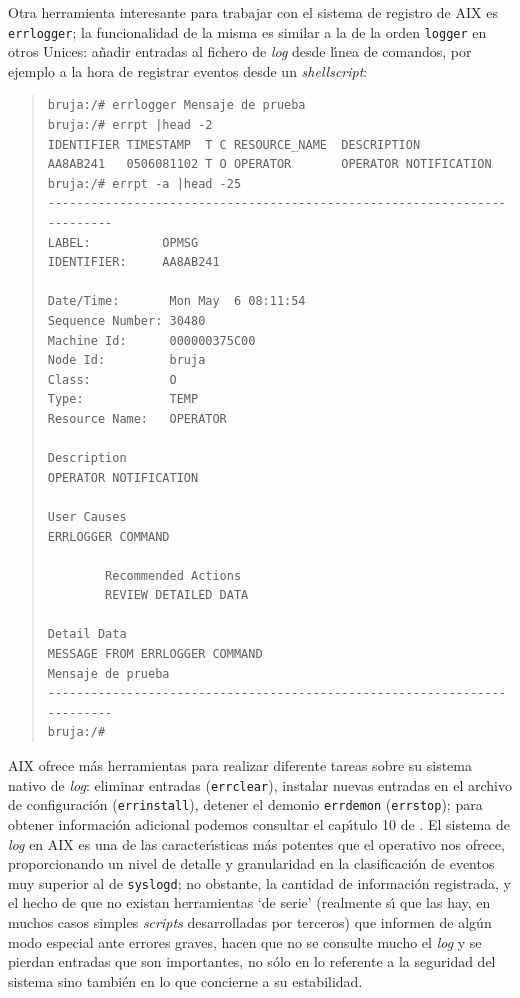 Otra herramienta interesante para trabajar con el sistema de registro de AIX
es {\tt errlogger}; la funcionalidad de la misma es similar a la de la orden
{\tt logger} en otros Unices: a\~nadir entradas al fichero de {\it log} desde
l\'{\i}nea de comandos, por ejemplo a la hora de registrar eventos desde un
{\it shellscript}:
\begin{quote}
\begin{verbatim}
bruja:/# errlogger Mensaje de prueba
bruja:/# errpt |head -2   
IDENTIFIER TIMESTAMP  T C RESOURCE_NAME  DESCRIPTION
AA8AB241   0506081102 T O OPERATOR       OPERATOR NOTIFICATION
bruja:/# errpt -a |head -25
-------------------------------------------------------------------------
LABEL:          OPMSG
IDENTIFIER:     AA8AB241

Date/Time:       Mon May  6 08:11:54 
Sequence Number: 30480
Machine Id:      000000375C00
Node Id:         bruja
Class:           O
Type:            TEMP
Resource Name:   OPERATOR

Description
OPERATOR NOTIFICATION

User Causes
ERRLOGGER COMMAND

        Recommended Actions
        REVIEW DETAILED DATA

Detail Data
MESSAGE FROM ERRLOGGER COMMAND
Mensaje de prueba
-------------------------------------------------------------------------
bruja:/#
\end{verbatim}
\end{quote}
AIX ofrece m\'as herramientas para realizar diferente tareas sobre su sistema 
nativo de {\it log}: eliminar entradas ({\tt errclear}), instalar nuevas 
entradas en el archivo de configuraci\'on ({\tt errinstall}), detener el 
demonio {\tt errdemon} ({\tt errstop}); para obtener informaci\'on adicional
podemos consultar el cap\'{\i}tulo 10 de \cite{kn:ibm97c}. El sistema de {\it 
log} en AIX es una de las caracter\'{\i}sticas m\'as potentes que 
el operativo nos ofrece, proporcionando un nivel de detalle y granularidad en
la clasificaci\'on de eventos muy superior al de {\tt syslogd}; no obstante, la
cantidad de informaci\'on registrada, y el hecho de que no existan herramientas
`de serie' (realmente s\'{\i} que las hay, en muchos casos simples {\it 
scripts} desarrolladas por terceros) que informen de alg\'un modo especial ante
errores graves, hacen que no se consulte mucho el {\it log} y se pierdan 
entradas que son importantes, no s\'olo en lo referente a la seguridad del
sistema sino tambi\'en en lo que concierne a su estabilidad.
